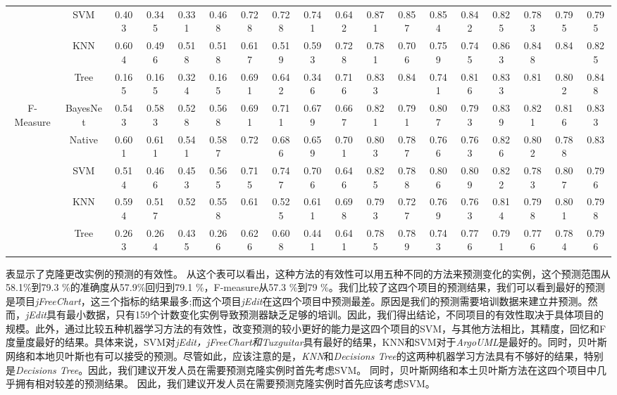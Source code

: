 {\begin{table*}[ht]
\begin{tabular}{|c|c|c|c|c|c|c|c|c|c|c|c|c|c|c|c|c|c|}
&SVM&	0.403	&0.345	&0.331	&0.468		&0.728	&0.728	&0.741	&0.642		&0.871	&0.857	&0.854	&0.842		&0.825	&0.783	&0.795	&0.795\\
&KNN&	0.604	&0.496	&0.518	&0.518		&0.617	&0.519	&0.593	&0.728		&0.781	&0.706	&0.759	&0.745		&0.863	&0.848	&0.84	&0.825\\
&Tree&	0.165	&0.165	&0.324	&0.165		&0.691	&0.642	&0.346	&0.716		&0.833	&0.84	&0.741	&0.816		&0.833	&0.81	&0.802	&0.848\\
\hline
\multirow{5}{*}{F-Measure}
&BayesNet&0.543	&0.583	&0.528	&0.568		&0.691	&0.711	&0.679	&0.667		&0.821	&0.791	&0.807	&0.793		&0.839	&0.821	&0.816	&0.833\\
&Native&0.601	&0.611	&0.541	&0.587		&0.72	&0.686	&0.659	&0.701		&0.803	&0.787	&0.766	&0.763		&0.826	&0.802	&0.788	&0.83\\
&SVM&	0.514	&0.466	&0.453	&0.565		&0.715	&0.747	&0.706	&0.646		&0.825	&0.788	&0.806	&0.809		&0.822	&0.783	&0.807	&0.796\\
&KNN&	0.594	&0.517	&0.52	&0.558		&0.61	&0.525	&0.611	&0.698		&0.793	&0.727	&0.769	&0.763		&0.814	&0.798	&0.801	&0.798\\
&Tree&	0.263	&0.264	&0.435	&0.266		&0.626	&0.608	&0.441	&0.641		&0.785	&0.789	&0.743	&0.776		&0.791	&0.776	&0.784	&0.796\\
\hline
\end{tabular}
\end{table*}


表显示了克隆更改实例的预测的有效性。
从这个表可以看出，这种方法的有效性可以用五种不同的方法来预测变化的实例，这个预测范围从58.1\%到79.3 \%的准确度从57.9\%回归到79.1 \%，F-measure从57.3 \%到79 \%。我们比较了这四个项目的预测结果，我们可以看到最好的预测是项目{\em  jFreeChart}，这三个指标的结果最多;而这个项目{\em jEdit}在这四个项目中预测最差。原因是我们的预测需要培训数据来建立井预测。然而，{\em jEdit}具有最小数据，只有159个计数变化实例导致预测器缺乏足够的培训。因此，我们得出结论，不同项目的有效性取决于具体项目的规模。此外，通过比较五种机器学习方法的有效性，改变预测的较小更好的能力是这四个项目的SVM，与其他方法相比，其精度，回忆和F度量度最好的结果。具体来说，SVM对{\em jEdit，jFreeChart和Tuxguitar}具有最好的结果，KNN和SVM对于{\em ArgoUML}是最好的。同时，贝叶斯网络和本地贝叶斯也有可以接受的预测。尽管如此，应该注意的是，{\em KNN}和{\em Decisions Tree}的这两种机器学习方法具有不够好的结果，特别是{\em Decisions Tree}。因此，我们建议开发人员在需要预测克隆实例时首先考虑SVM。
同时，贝叶斯网络和本土贝叶斯方法在这四个项目中几乎拥有相对较差的预测结果。
因此，我们建议开发人员在需要预测克隆实例时首先应该考虑SVM。

}
